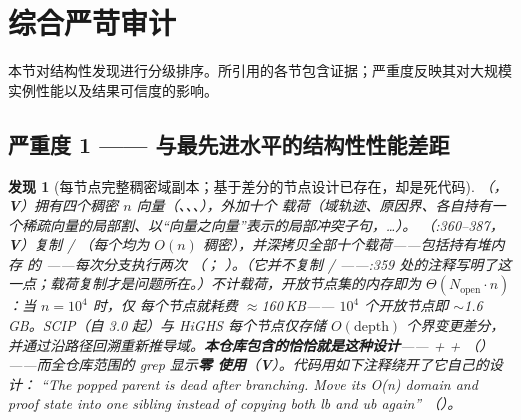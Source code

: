 \documentclass[11pt]{ctexart}
\newtheorem{finding}{发现}
\begin{document}
\section{综合严苛审计}

本节对结构性发现进行分级排序。所引用的各节包含证据；严重度反映其对大规模实例性能以及结果可信度的影响。

\subsection{严重度 1 —— 与最先进水平的结构性性能差距}

\begin{finding}[每节点完整稠密域副本；基于差分的节点设计已存在，却是死代码]
\label{find:node-memory}
（，\textbf{V}）拥有四个稠密
$n$ 向量（、、、），外加十个
 载荷（域轨迹、原因界、各自持有一个稀疏向量的局部割、以“向量之向量”表示的局部冲突子句，\dots）。
（:360--387，\textbf{V}）复制 /
（每个均为 $O(n)$ 稠密），\emph{并深拷贝全部十个载荷}——包括持有堆内存
 的 ——每次分支执行两次
（；
）。（它\emph{并不}复制 /
——:359 处的注释写明了这一点；载荷复制才是问题所在。）不计载荷，开放节点集的内存即为 $\Theta(N_{\mathrm{open}} \cdot n)$：当 $n = 10^4$ 时，仅  每个节点就耗费 $\approx$160\,KB——
$10^4$ 个开放节点即 $\sim$1.6\,GB。SCIP（自 3.0 起）与 HiGHS 每个节点仅存储
$O(\mathrm{depth})$ 个界变更\emph{差分}，并通过沿路径回溯重新推导域。\textbf{本仓库包含的恰恰就是这种设计}——
 +  + 
（）——而全仓库范围的 grep 显示\textbf{零
使用}（\textbf{V}）。代码用如下注释绕开了它自己的设计：
\emph{“The popped parent is dead after branching. Move its O(n) domain and
proof state into one sibling instead of copying both lb and ub again”}
（）。
\end{finding}
\end{document}
